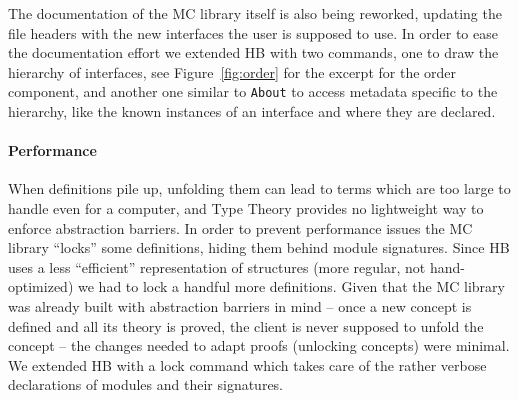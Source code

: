 \documentclass{easychair}
\def\MC{{\sf MC}}
\def\HB{{\sf HB}}
\begin{document}
The documentation of the \MC{} library itself is also being reworked, updating
the file headers with the new interfaces the user is supposed to use.
In order to ease the documentation effort we extended \HB{} with two commands,
one to draw the hierarchy of interfaces, see Figure~\ref{fig:order} for the excerpt
for the order component, and another one similar to \verb+About+ to access
metadata specific to the hierarchy, like the known instances of an interface
and where they are declared.
%
%
\paragraph{Performance}

When definitions pile up, unfolding
them can lead to terms which are too large to handle even for a computer,
and Type Theory provides no lightweight way to enforce abstraction barriers.
In order to prevent performance issues the \MC{} library ``locks''
some definitions, hiding them behind module signatures.
Since \HB{} uses a less ``efficient'' representation of
structures (more regular, not hand-optimized) we had to lock a handful
more definitions.
Given that the \MC{} library was already built with abstraction barriers
in mind --
once a new concept is defined and all its theory is proved, the client
is never supposed to unfold the concept -- the changes needed to adapt
proofs (unlocking concepts) were minimal. We extended \HB{} with
a lock command which takes care of the rather verbose declarations of modules
and their signatures.
\end{document}
